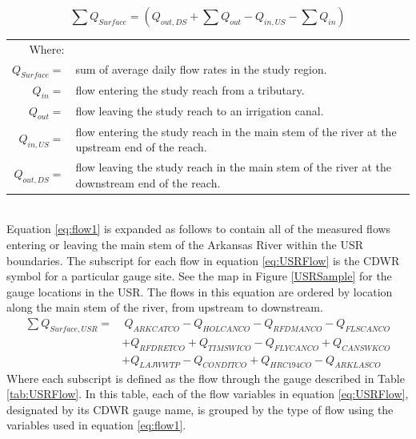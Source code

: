 \begin{equation}
\label{eq:flow1}
\sum Q_{Surface} = \left( Q_{out,DS} + \sum Q_{out} - Q_{in,US} - \sum Q_{in} \right) 
\end{equation}
\begin{tabular}{r p{5.5in}}
	Where: & \\
	$ Q_{Surface} = $ & sum of average daily flow rates in the study region.\\
	$ Q_{in} = $ & flow entering the study reach from a tributary.\\
	$ Q_{out} = $ & flow leaving the study reach to an irrigation canal.\\
	$ Q_{in,US} = $ & flow entering the study reach in the main stem of the river at the upstream end of the reach.\\
	$ Q_{out,DS} = $ & flow leaving the study reach in the main stem of the river at the downstream end of the reach.\\
\end{tabular}\\

Equation \ref{eq:flow1} is expanded as follows to contain all of the measured flows entering or leaving the main stem of the Arkansas River within the USR boundaries.  The subscript for each flow in equation \ref{eq:USRFlow} is the CDWR symbol for a particular gauge site.  See the map in Figure \ref{USRSample} for the gauge locations in the USR.  The flows in this equation are ordered by location along the main stem of the river, from upstream to downstream.
\begin{align}
	\label{eq:USRFlow}
	\sum Q_{Surface,USR} = &~Q_{ARKCATCO} - Q_{HOLCANCO} - Q_{RFDMANCO} - Q_{FLSCANCO} \\
	\nonumber & + Q_{RFDRETCO} + Q_{TIMSWICO} - Q_{FLYCANCO} + Q_{CANSWKCO} \\ 
	\nonumber & + Q_{LAJWWTP} - Q_{CONDITCO} + Q_{HRC194CO} - Q_{ARKLASCO}
\end{align}
Where each subscript is defined as the flow through the gauge described in Table \ref{tab:USRFlow}.  In this table, each of the flow variables in equation \ref{eq:USRFlow}, designated by its CDWR gauge name, is grouped by the type of flow using the variables used in equation \ref{eq:flow1}.

